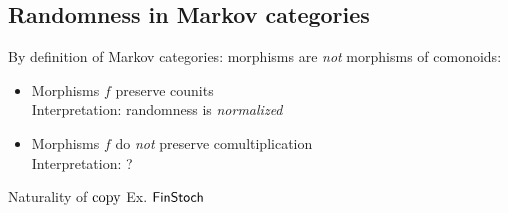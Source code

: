 \subsection{Randomness in Markov categories}

\begin{frame}
	By definition of Markov categories: 
	morphisms are \textit{not} morphisms of comonoids: 
	\begin{itemize}
		\item Morphisms $f$ preserve counits
		\\ \pause
		Interpretation: randomness is \textit{normalized}
		\pause
		\item Morphisms $f$ do \textit{not} preserve comultiplication
		\\ \pause
		Interpretation: ?
	\end{itemize}
\end{frame}

\begin{frame}{Naturality of $\operatorname{copy}$}
	Ex. $\mathsf{FinStoch}$
\end{frame}